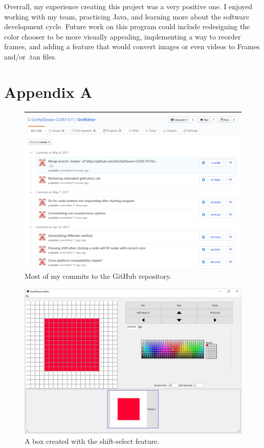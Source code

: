 \documentclass[12pt]{article}
\begin{document}
Overrall, my experience creating this project was a very positive one. I enjoyed working with my team, practicing Java, and learning more about the software development cycle. Future work on this program could include redesigning the color chooser to be more visually appealing, implementing a way to reorder frames, and adding a feature that would convert images or even videos to Frames and/or .tan files.

\pagebreak

\section*{Appendix A}

\begin{figure}[h]
  \includegraphics[width=\linewidth]{Commits.png}
  \caption{Most of my commits to the GitHub repository.}
  \label{fig:Git commits}
\end{figure}


\begin{figure}[h]
  \includegraphics[width=\linewidth]{GUI.png}
  \caption{A box created with the shift-select feature.}
  \label{fig:Git commits}
\end{figure}
\end{document}
